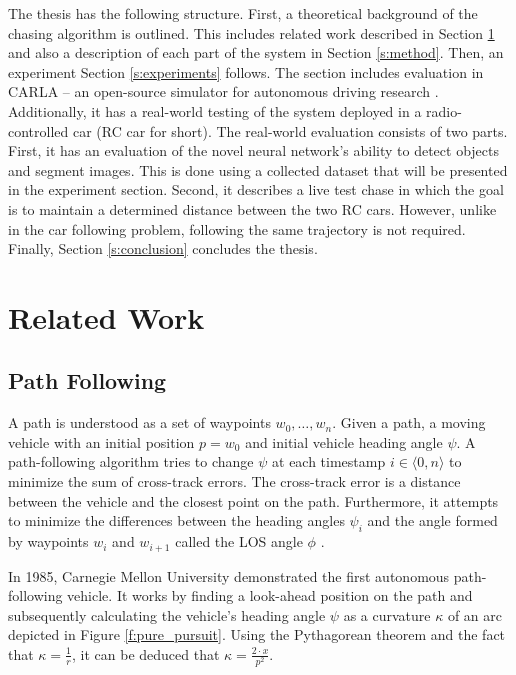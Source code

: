 \documentclass{ctuthesis/ctuthesis}
\begin{document}
The thesis has the following structure. First, a theoretical background of the chasing algorithm is outlined. This includes related work described in Section \ref{s:related_work} and also a description of each part of the system in Section \ref{s:method}. Then, an experiment Section \ref{s:experiments} follows. The section includes evaluation in CARLA -- an open-source simulator for autonomous driving research \cite{CARLA}. Additionally, it has a real-world testing of the system deployed in a radio-controlled car (RC car for short). The real-world evaluation consists of two parts. First, it has an evaluation of the novel neural network's ability to detect objects and segment images. This is done using a collected dataset that will be presented in the experiment section. Second, it describes a live test chase in which the goal is to maintain a determined distance between the two RC cars. However, unlike in the car following problem, following the same trajectory is not required. Finally, Section \ref{s:conclusion} concludes the thesis.




\chapter{Related Work}\label{s:related_work}
\section{Path Following}
A path is understood as a set of waypoints $w_0,\dots ,w_n$. Given a path, a moving vehicle with an initial position $p=w_0$ and initial vehicle heading angle $\psi$. A path-following algorithm tries to change $\psi$ at each timestamp $i \in \langle 0,n\rangle$ to minimize the sum of cross-track errors. The cross-track error is a distance between the vehicle and the closest point on the path. Furthermore, it attempts to minimize the differences between the heading angles $\psi_i$ and the angle formed by waypoints $w_i$ and $w_{i+1}$ called the LOS angle $\phi$ \cite{path_following_evaluation}.\par

In 1985, Carnegie Mellon University \cite{pure_pursuit_orig} demonstrated the first autonomous path-following vehicle. It works by finding a look-ahead position on the path and subsequently calculating the vehicle's heading angle $\psi$ as a curvature $\kappa$ of an arc depicted in Figure \ref{f:pure_pursuit}. Using the Pythagorean theorem and the fact that $\kappa=\frac{1}{r}$, it can be deduced that $\kappa = \frac{2\cdot x}{p^2}$. \par
\end{document}
